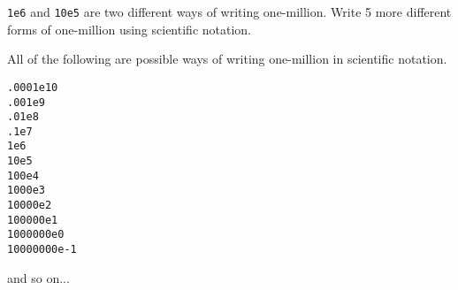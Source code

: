 
\verb+1e6+ and \verb+10e5+ are two different ways of writing
one-million.  Write 5 more different forms of one-million using
scientific notation.\\ 
\TextEntry

\begin{AnswerText}
All of the following are possible ways of writing one-million in scientific notation.
\begin{verbatim}
.0001e10
.001e9
.01e8
.1e7
1e6
10e5
100e4
1000e3
10000e2
100000e1
1000000e0
10000000e-1
\end{verbatim}
and so on...
\end{AnswerText}
